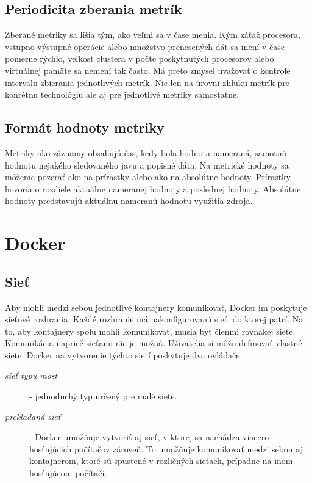 \documentclass[11pt,final,oneside]{fithesis}
\begin{document}
\subsection{Periodicita zberania metrík}
Zberané metriky sa líšia tým, ako veľmi sa v čase menia. Kým záťaž procesora, vstupno-výstupné operácie alebo množstvo prenesených dát sa mení v čase pomerne rýchlo, veľkosť clustera v počte poskytnutých procesorov 
alebo virtuálnej pamäte sa nemení tak často. Má preto zmysel uvažovať o kontrole intervalu zbierania jednotlivých metrík. Nie len na úrovni zhluku metrík pre konrétnu technológiu ale aj pre jednotlivé metriky samostatne.

\subsection{Formát hodnoty metriky}
Metriky ako záznamy obsahujú čas, kedy bola hodnota nameraná, samotnú hodnotu nejakého sledovaného javu a popisné dáta. Na metrické
hodnoty sa môžeme pozerať ako na prírastky alebo ako na absolútne hodnoty. Prírastky hovoria o rozdiele aktuálne nameranej hodnoty 
a poslednej hodnoty. Absolútne hodnoty predstavujú aktuálnu nameranú hodnotu využitia zdroja. 

\section{Docker}
\subsection{Sieť}
Aby mohli medzi sebou jednotlivé kontajnery komunikovať, Docker im poskytuje sieťové rozhrania. Každé rozhranie má nakonfigurovanú sieť,
do ktorej patrí. Na to, aby kontajnery spolu mohli komunikovať, musia byť členmi rovnakej siete. Komunikácia naprieč sieťami nie je možná.
Užívatelia si môžu definovať vlastné siete. Docker na vytvorenie týchto sietí poskytuje dva ovládače.

\begin{description}
\item[\emph{sieť typu most}] - jednoduchý typ určený pre malé siete.
\item[\emph{prekladaná sieť}] - Docker umožňuje vytvoriť aj sieť, v ktorej sa nachádza viacero hosťujúcich počítačov zároveň. To umožňuje 
komunikovať medzi sebou aj kontajnerom, ktoré sú spustené v rozličných sieťach, prípadne na inom hosťujúcom počítači.
\end{description}
\end{document}
